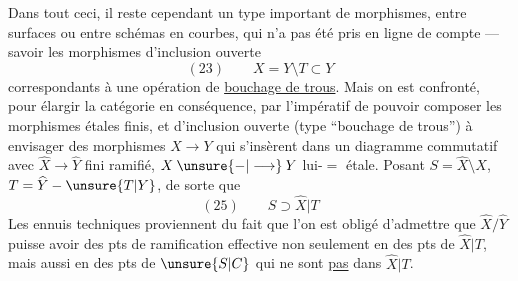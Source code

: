 Dans tout ceci, il reste cependant un
type important de  morphismes, entre
surfaces   ou entre schémas en
courbes, qui n'a pas été pris en ligne
de compte --- savoir les morphismes
d'inclusion ouverte
\[
(23)\qquad X=Y\setminus T\subset Y
\]
correspondants à une opération de \uline{bouchage
de trous}. Mais on est confronté, pour élargir la
catégorie en conséquence, par l'impératif de
pouvoir composer les morphismes étales finis,
et d'inclusion ouverte (type ``bouchage de trous'')
à envisager des morphismes $X\longrightarrow Y$ qui
s'insèrent dans un diagramme commutatif
avec $\widehat X\longrightarrow\widehat Y$ fini ramifié, $X\mathbin{\unsure{-|\longrightarrow}}Y$ lui-$=$ étale.
Posant $S=\widehat X\setminus X$, $T=\widehat Y-\unsure{T|Y}$, de sorte que
\[
(25)\qquad S\supset\widehat X|T
\]
Les ennuis techniques proviennent du fait que
l'on est obligé d'admettre que $\widehat X/\widehat Y$ puisse avoir des
pts de ramification effective non seulement en
des pts de $\widehat X|T$, mais aussi en des pts de $\unsure{S|C}$ qui
ne sont \uline{pas} dans $\widehat X|T$.
